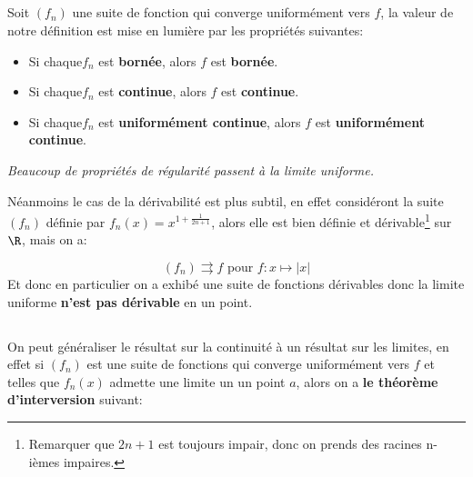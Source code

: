 \subsection*{}
Soit \((f_n)\) une suite de fonction qui converge uniformément vers \(f\), la valeur de notre définition est mise en lumière par les propriétés suivantes:
\begin{itemize}
   \item Si chaque\(f_n\) est \textbf{bornée}, alors \(f\) est \textbf{bornée}.
   \item Si chaque\(f_n\) est \textbf{continue}, alors \(f\) est \textbf{continue}.   
   \item Si chaque\(f_n\) est \textbf{uniformément continue}, alors \(f\) est \textbf{uniformément continue}.
\end{itemize}
\begin{center}
   \textit{Beaucoup de propriétés de régularité passent à la limite uniforme.}
\end{center}
Néanmoins le cas de la dérivabilité est plus subtil, en effet considéront la suite \((f_n)\) définie par \(f_n(x) = x^{1+\frac{1}{2n+1}}\), alors elle est bien définie et dérivable\footnote[1]{Remarquer que \(2n+1\) est toujours impair, donc on prends des racines n-ièmes impaires.} sur \(\R\), mais on a:
\begin{center}
\end{center}
\[
   (f_n) \rightrightarrows f \text{ pour } f : x \mapsto |x|
\]
Et donc en particulier on a exhibé une suite de fonctions dérivables donc la limite uniforme \textbf{n'est pas dérivable} en un point.
\subsection*{}
On peut généraliser le résultat sur la continuité à un résultat sur les limites, en effet si \((f_n)\) est une suite de fonctions qui converge uniformément vers \(f\) et telles que \(f_n(x)\) admette une limite un un point \(a\), alors on a \textbf{le théorème d'interversion} suivant:
